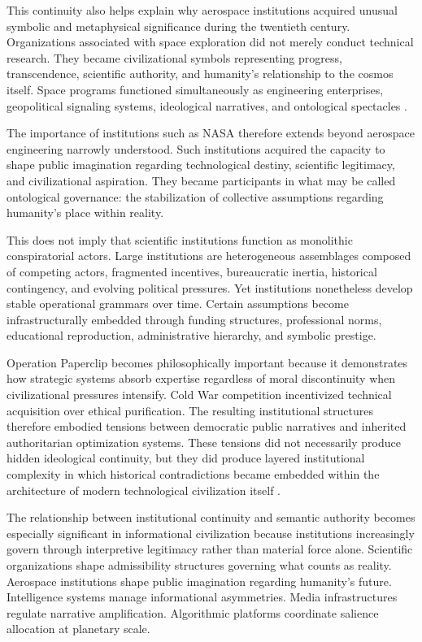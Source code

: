 \documentclass[11pt,a4paper]{article}
\begin{document}
This continuity also helps explain why aerospace institutions acquired unusual symbolic and metaphysical significance during the twentieth century. Organizations associated with space exploration did not merely conduct technical research. They became civilizational symbols representing progress, transcendence, scientific authority, and humanity's relationship to the cosmos itself. Space programs functioned simultaneously as engineering enterprises, geopolitical signaling systems, ideological narratives, and ontological spectacles \cite{mcdougall1985}.

The importance of institutions such as NASA therefore extends beyond aerospace engineering narrowly understood. Such institutions acquired the capacity to shape public imagination regarding technological destiny, scientific legitimacy, and civilizational aspiration. They became participants in what may be called ontological governance: the stabilization of collective assumptions regarding humanity's place within reality.

This does not imply that scientific institutions function as monolithic conspiratorial actors. Large institutions are heterogeneous assemblages composed of competing actors, fragmented incentives, bureaucratic inertia, historical contingency, and evolving political pressures. Yet institutions nonetheless develop stable operational grammars over time. Certain assumptions become infrastructurally embedded through funding structures, professional norms, educational reproduction, administrative hierarchy, and symbolic prestige.

Operation Paperclip becomes philosophically important because it demonstrates how strategic systems absorb expertise regardless of moral discontinuity when civilizational pressures intensify. Cold War competition incentivized technical acquisition over ethical purification. The resulting institutional structures therefore embodied tensions between democratic public narratives and inherited authoritarian optimization systems. These tensions did not necessarily produce hidden ideological continuity, but they did produce layered institutional complexity in which historical contradictions became embedded within the architecture of modern technological civilization itself \cite{lichtblau2014}.

The relationship between institutional continuity and semantic authority becomes especially significant in informational civilization because institutions increasingly govern through interpretive legitimacy rather than material force alone. Scientific organizations shape admissibility structures governing what counts as reality. Aerospace institutions shape public imagination regarding humanity's future. Intelligence systems manage informational asymmetries. Media infrastructures regulate narrative amplification. Algorithmic platforms coordinate salience allocation at planetary scale.
\end{document}
